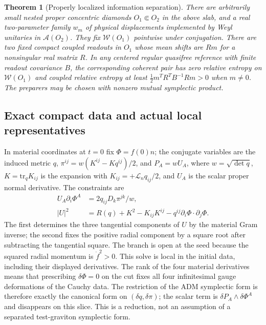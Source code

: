 \documentclass[11pt]{article}
\newtheorem{theorem}{Theorem}[section]
\begin{document}
\begin{theorem}[Properly localized information separation]\label{thm:local}
There are arbitrarily small nested proper concentric diamonds \(O_1\Subset O_2\) in the above slab, and a real two-parameter family \(w_m\) of physical displacements implemented by Weyl unitaries in \(\mathcal A(O_2)\). They fix \(\mathcal W(O_1)\) pointwise under conjugation. There are two fixed compact coupled readouts in \(O_1\) whose mean shifts are \(Rm\) for a nonsingular real matrix \(R\). In any centered regular quasifree reference with finite readout covariance \(B\), the corresponding coherent pair has zero relative entropy on \(\mathcal W(O_1)\) and coupled relative entropy at least \(\tfrac12m^TR^TB^{-1}Rm>0\) when \(m\ne0\). The preparers may be chosen with nonzero mutual symplectic product.
\end{theorem}

\subsection{Exact compact data and actual local representatives}

In material coordinates at \(t=0\) fix \(\Phi=f(0)n\); the conjugate variables are the induced metric \(q\), \(\pi^{ij}=w(K^{ij}-Kq^{ij})/2\), and \(P_A=w U_A\), where \(w=\sqrt{\det q}\), \(K=\mathrm{tr}_q K_{ij}\) is the expansion with \(K_{ij}=+\mathcal L_n q_{ij}/2\), and \(U_A\) is the scalar proper normal derivative. The constraints are
\begin{align}
 U_A\partial_i\Phi^A&=2q_{ij}D_k\pi^{jk}/w,\\
 |U|^2&=R(q)+K^2-K_{ij}K^{ij}-q^{ij}\partial_i\Phi\cdot\partial_j\Phi .
 \label{eq:constraints}
\end{align}
The first determines the three tangential components of \(U\) by the material Gram inverse; the second fixes the positive radial component by a square root after subtracting the tangential square. The branch is open at the seed because the squared radial momentum is \(\dot f^2>0\). This solve is local in the initial data, including their displayed derivatives. The rank of the four material derivatives means that prescribing \(\delta\Phi=0\) on the cut fixes all four infinitesimal gauge deformations of the Cauchy data. The restriction of the ADM symplectic form is therefore exactly the canonical form on \((\delta q,\delta\pi)\); the scalar term is \(\delta P_A\wedge\delta\Phi^A\) and disappears on this slice. This is a reduction, not an assumption of a separated test-graviton symplectic form.
\end{document}
